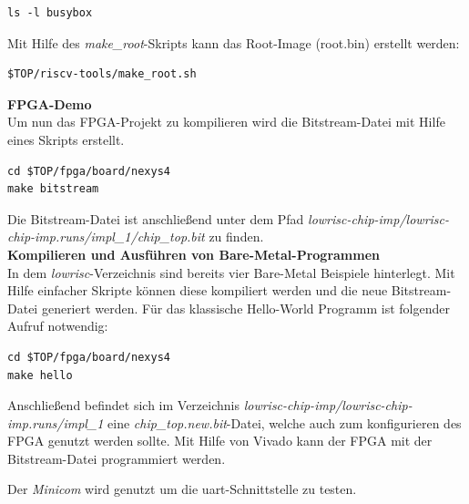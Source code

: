 \begin{lstlisting}[caption={BusyBox},label={code:busybox}]
ls -l busybox
\end{lstlisting}

Mit Hilfe des \emph{make\_root}-Skripts kann das Root-Image (root.bin) erstellt werden:\\


\begin{lstlisting}[caption={Generieren des Root-Image},label={code:rootimage}]
$TOP/riscv-tools/make_root.sh
\end{lstlisting}

\textbf{FPGA-Demo}\\

Um nun das FPGA-Projekt zu kompilieren wird die Bitstream-Datei mit Hilfe eines Skripts erstellt.\\

\begin{lstlisting}[caption={Erzeugen des Bitfiles},label={code:bitfile}]
cd $TOP/fpga/board/nexys4
make bitstream
\end{lstlisting}


Die Bitstream-Datei ist anschließend unter dem Pfad \emph{lowrisc-chip-imp/lowrisc-chip-imp.runs/impl\_1/chip\_top.bit} zu finden.\\

\textbf{Kompilieren und Ausführen von Bare-Metal-Programmen}\\

In dem \emph{lowrisc}-Verzeichnis sind bereits vier Bare-Metal Beispiele hinterlegt. Mit Hilfe einfacher Skripte können diese kompiliert werden und die neue Bitstream-Datei generiert werden.
Für das klassische Hello-World Programm ist folgender Aufruf notwendig:\\

\begin{lstlisting}[caption={Erzeugen und kompilieren eines Beispielprogrammes},label={code:helloworld}]
cd $TOP/fpga/board/nexys4
make hello
\end{lstlisting}


Anschließend befindet sich im Verzeichnis \emph{lowrisc-chip-imp/lowrisc-chip-imp.runs/impl\_1} eine \emph{chip\_top.new.bit}-Datei, welche auch zum konfigurieren des FPGA genutzt werden sollte.
Mit Hilfe von Vivado kann der FPGA mit der Bitstream-Datei programmiert werden.

Der \emph{Minicom} wird genutzt um die \ac{uart}-Schnittstelle zu testen.\\

